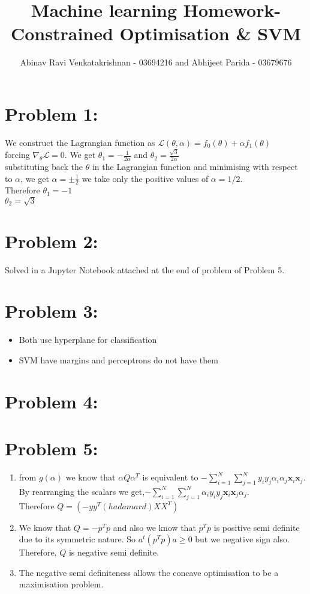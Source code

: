 \documentclass[5pt,a4paper]{article}
\begin{document}
	\title{Machine learning Homework- Constrained Optimisation \& SVM }
	\author{Abinav Ravi Venkatakrishnan - 03694216 and Abhijeet Parida - 03679676}
	\maketitle
	\section*{Problem 1:}
	We construct the Lagrangian function as
	$\mathcal{L}(\theta, \alpha)=f_0(\theta)+\alpha f_1(\theta)$\\
	forcing $\nabla_\theta \mathcal{L}=0$. We get $\theta_1=-\frac{1}{2\alpha}$ and $\theta_2=\frac{\sqrt{3}}{2\alpha}$\\
	substituting back the $\theta$ in the Lagrangian function and minimising with respect to $\alpha$, we get $\alpha=\pm \frac{1}{2}$ we take only the positive values of $\alpha=1/2$.\\
	Therefore $\theta_1=-1$\\
	$\theta_2=\sqrt{3}$
	
	\section*{Problem 2:}
	Solved in a Jupyter Notebook attached at the end of problem of Problem 5.
	
	\section*{Problem 3:}
	\begin{itemize}
		\item Both use hyperplane for classification
		\item SVM have margins and perceptrons do not have them
	\end{itemize}
	
	\section*{Problem 4:}
	
	\section*{Problem 5:}
	\begin{enumerate}
		\item from $g(\alpha)$ we know that $\alpha Q\alpha^T$ is equivalent to $-\sum_{i=1}^{N}\sum_{j=1}^{N} y_i y_j \alpha_i \alpha_j \textbf{x}_i \textbf{x}_j$. By rearranging the scalars we get,$-\sum_{i=1}^{N}\sum_{j=1}^{N}\alpha_i  y_i y_j  \textbf{x}_i \textbf{x}_j \alpha_j$. \\Therefore $Q= (-yy^T(hadamard)XX^T)$		\item We know that $Q=-p^Tp$ and also we know that $p^Tp$ is positive semi definite due to its symmetric nature. So $a^t (p^Tp)a \geq 0$ but we negative sign also. Therefore, $Q$ is negative semi definite.
		\item The negative semi definiteness allows the concave optimisation to be a maximisation problem. 
	\end{enumerate}
	
\end{document}
